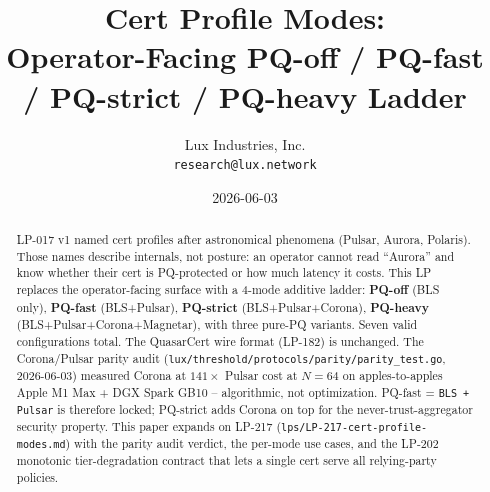 \documentclass[11pt,a4paper]{article}
\title{Cert Profile Modes:\\
       Operator-Facing PQ-off / PQ-fast / PQ-strict / PQ-heavy Ladder}
\author{Lux Industries, Inc. \\
        \texttt{research@lux.network}}
\date{2026-06-03}
\begin{document}
\luxcoverpage

\begin{abstract}
LP-017 v1 named cert profiles after astronomical phenomena (Pulsar,
Aurora, Polaris). Those names describe internals, not posture: an
operator cannot read ``Aurora'' and know whether their cert is
PQ-protected or how much latency it costs. This LP replaces the
operator-facing surface with a 4-mode additive ladder:
\textbf{PQ-off} (BLS only), \textbf{PQ-fast} (BLS+Pulsar),
\textbf{PQ-strict} (BLS+Pulsar+Corona), \textbf{PQ-heavy}
(BLS+Pulsar+Corona+Magnetar), with three pure-PQ variants. Seven
valid configurations total. The QuasarCert wire format (LP-182) is
unchanged. The Corona/Pulsar parity audit
(\texttt{lux/threshold/protocols/parity/parity\_test.go},
2026-06-03) measured Corona at $141\times$ Pulsar cost at $N{=}64$
on apples-to-apples Apple M1 Max + DGX Spark GB10 -- algorithmic,
not optimization. PQ-fast = \texttt{BLS + Pulsar} is therefore
locked; PQ-strict adds Corona on top for the never-trust-aggregator
security property. This paper expands on LP-217
(\texttt{lps/LP-217-cert-profile-modes.md}) with the parity audit
verdict, the per-mode use cases, and the LP-202 monotonic
tier-degradation contract that lets a single cert serve all
relying-party policies.
\end{abstract}

\tableofcontents
\newpage









\end{document}
